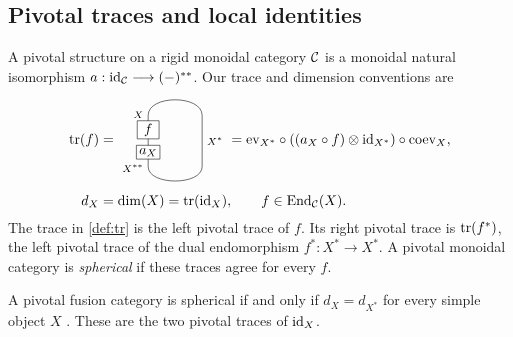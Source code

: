 \documentclass{amsart}
\begin{document}
\subsection{Pivotal traces and local identities}
A pivotal structure on a rigid monoidal category $\mathcal{C}$ is a monoidal natural isomorphism
$a:\mathrm{id}_{\mathcal{C}}\longrightarrow(-)^{**}$. Our trace and dimension conventions are
\begin{equation}\label{def:tr}
\begin{aligned}
 \tr(f)&=
 \vcenter{\hbox{\begin{tikzpicture}[scale=.8]
 \draw (0,0) .. controls (0,.65) and (1.7,.65) .. (1.7,0)
       -- (1.7,-1.6) .. controls (1.7,-2.2) and (0,-2.2) .. (0,-1.6)
       -- (0,0);
 \node[draw,fill=white,minimum width=.55cm,inner sep=2pt] at (0,-.45) {$f$};
 \node[draw,fill=white,minimum width=.55cm,inner sep=2pt] at (0,-1.15) {$a_X$};
 \node[left,font=\scriptsize] at (0,.02) {$X$};
 \node[left,font=\scriptsize] at (0,-1.65) {$X^{**}$};
 \node[right,font=\scriptsize] at (1.7,-.8) {$X^*$};
 \end{tikzpicture}}}
 =\ev_{X^*}\circ((a_X\circ f)\otimes\id_{X^*})\circ\coev_X,\\[2pt]
 d_X&=\dim(X)=\tr(\id_X),\qquad f\in\End_{\mC}(X).
\end{aligned}
\end{equation}
The trace in \eqref{def:tr} is the left pivotal trace of $f$.
Its right pivotal trace is $\mathrm{tr}(f^*)$, the left pivotal trace of the dual
endomorphism $f^*:X^*\to X^*$. A pivotal monoidal category is
\emph{spherical} if these traces agree for every $f$.\label{def:sph}

\begin{remark}\label{rk:sph}
A pivotal fusion category is spherical if and only if $d_X=d_{X^*}$ for every simple object $X$ \cite[Definition~4.7.14 and Theorem~4.7.15]{EGNO15}. These are the two pivotal traces of $\mathrm{id}_X$.
\end{remark}
\end{document}
